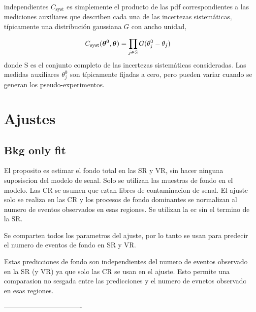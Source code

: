 independientes $C_\text{syst}$ es simplemente el producto de las pdf
correspondientes a las mediciones auxiliares que describen cada una de las
incertezas sistemáticas, típicamente una distribución gaussiana $G$ con ancho
unidad,

\begin{equation}
  C_\text{syst} (\bm{\theta}^0, \bm{\theta}) = \prod_{j \in \text{S}} G(\theta_j^0 -
  \theta_j)
\end{equation}
%
donde S es el conjunto completo de las incertezas sistemáticas consideradas. Las
medidas auxiliares $\theta^0_j$ son típicamente fijadas a cero, pero pueden
variar cuando se generan los pseudo-experimentos.


\section{Ajustes}


\subsection{Bkg only fit}

El proposito  es estimar el fondo total en las SR y VR, sin hacer ninguna suposiscion del
modelo de senal. Solo se utilizan las muestras de fondo en el modelo. Las CR se asumen que eztan libres
de contaminacion de senal.  El ajuste solo se realiza en las CR y los procesos de fondo
dominantes se normalizan al numero de eventos observados en esas regiones.
Se utilizan la ec sin el termino de la SR.

Se comparten todos los parametros del ajuste, por lo tanto se usan para predecir
el numero de eventos de fondo en SR y VR.

Estas predicciones de fondo son independientes del numero de eventos observado en la SR (y VR)
ya que solo las CR se usan en el ajuste. Esto permite una comparasion no sesgada entre las
predicciones y el numero de evnetos observado en esas regiones.






----------------------------------


